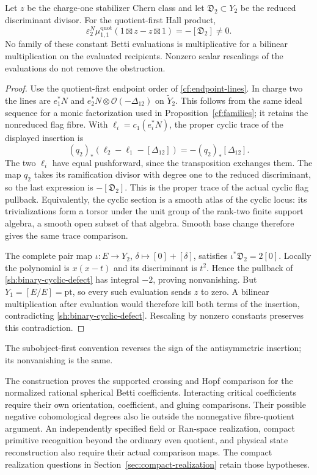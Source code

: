 \begin{proposition}\label{sh:cyclic-defect}
Let $z$ be the charge-one stabilizer Chern class and let
$\mathfrak D_2\subset Y_2$ be the reduced discriminant divisor.
For the quotient-first Hall product,
\begin{equation}\label{sh:binary-cyclic-defect}
 \varepsilon_2^N\mu^{\mathrm{quot}}_{1,1}
             (1\boxtimes z-z\boxtimes1)
       =-[\mathfrak D_2]\ne0.
\end{equation}
No family of these constant Betti evaluations is multiplicative
for a bilinear multiplication on the evaluated recipients.
Nonzero scalar rescalings of the evaluations do not remove the
obstruction.
\end{proposition}
\begin{proof}
Use the quotient-first endpoint order of
\eqref{cf:endpoint-lines}. In charge two the lines are
$e_1^*N$ and $e_2^*N\otimes\mathcal O(-\Delta_{12})$ on
$\widetilde Y_2$. This follows from the same ideal sequence
for a monic factorization used in
Proposition~\ref{cf:families}; it retains the nonreduced flag
fibre. With $\ell_i=c_1(e_i^*N)$, the proper cyclic trace of
the displayed insertion is
\[
 (q_2)_*(\ell_2-\ell_1-[\Delta_{12}])
          =-(q_2)_*[\Delta_{12}].
\]
The two $\ell_i$ have equal pushforward, since the transposition
exchanges them. The map $q_2$ takes its ramification divisor
with degree one to the reduced discriminant, so the last
expression is $-[\mathfrak D_2]$.
This is the proper trace of the actual cyclic flag pullback.
Equivalently, the cyclic section is a smooth atlas of the cyclic
locus: its trivializations form a torsor under the unit group
of the rank-two finite support algebra, a smooth open subset of
that algebra. Smooth base change therefore gives the same trace
comparison.

The complete pair map
$\iota:E\to Y_2$, $\delta\mapsto[0]+[\delta]$, satisfies
$\iota^*\mathfrak D_2=2[0]$. Locally the polynomial is
$x(x-t)$ and its discriminant is $t^2$. Hence the pullback of
\eqref{sh:binary-cyclic-defect} has integral $-2$, proving
nonvanishing. But $Y_1=[E/E]=\mathrm{pt}$, so every such
evaluation sends $z$ to zero. A bilinear multiplication after
evaluation would therefore kill both terms of the insertion,
contradicting \eqref{sh:binary-cyclic-defect}. Rescaling by
nonzero constants preserves this contradiction.
\end{proof}

The subobject-first convention reverses the sign of the
antisymmetric insertion; its nonvanishing is the same.

The construction proves the supported crossing and Hopf comparison
for the normalized rational spherical Betti coefficients.
Interacting critical coefficients require their own orientation,
coefficient, and gluing comparisons. Their possible negative
cohomological degrees also lie outside the nonnegative
fibre-quotient argument. An independently specified
field or Ran-space realization, compact primitive recognition
beyond the ordinary even quotient, and physical state
reconstruction also require their actual comparison maps.
The compact realization questions in
Section~\ref{sec:compact-realization} retain those hypotheses.
